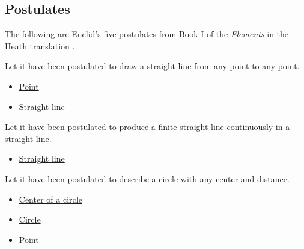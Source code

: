 \subsection*{Postulates}

The following are Euclid's five postulates from Book I of the
\textit{Elements} in the Heath translation
\citep[Book I, Postulates 1--5]{euclid-elements-heath}.

\begin{axiom}
\label{ax-euclid-postulate-draw-straight-line}
Let it have been postulated to draw a straight line from any point to any point.
\end{axiom}
\begin{lra-not-visible}
\begin{dependencies}
\begin{itemize}
  \item \hyperref[def-euclid-point]{Point}
  \item \hyperref[def-euclid-straight-line]{Straight line}
\end{itemize}
\end{dependencies}
\end{lra-not-visible}

\begin{axiom}
\label{ax-euclid-postulate-produce-straight-line}
Let it have been postulated to produce a finite straight line continuously in a
straight line.
\end{axiom}
\begin{lra-not-visible}
\begin{dependencies}
\begin{itemize}
  \item \hyperref[def-euclid-straight-line]{Straight line}
\end{itemize}
\end{dependencies}
\end{lra-not-visible}

\begin{axiom}
\label{ax-euclid-postulate-describe-circle}
Let it have been postulated to describe a circle with any center and distance.
\end{axiom}
\begin{lra-not-visible}
\begin{dependencies}
\begin{itemize}
  \item \hyperref[def-euclid-center-of-a-circle]{Center of a circle}
  \item \hyperref[def-euclid-circle]{Circle}
  \item \hyperref[def-euclid-point]{Point}
\end{itemize}
\end{dependencies}
\end{lra-not-visible}

